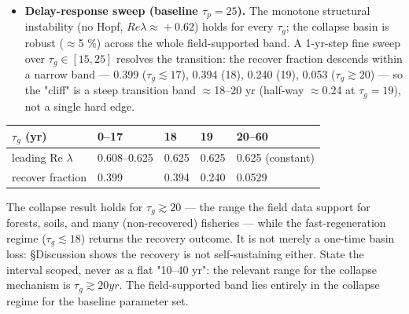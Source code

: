 \documentclass[11pt]{article}
\begin{document}
\begin{itemize}
\item \textbf{Delay-response sweep (baseline $\tau{}_{p}=25$).} The monotone structural instability (no Hopf, $Re \lambda{} \approx{} +0.62$) holds for every $\tau{}_{g}$; the collapse basin is robust (\ensuremath{\approx{}}5 \%) across the whole field-supported band. A 1-yr-step fine sweep over $\tau{}_{g} \in{} [15,25]$ resolves the transition: the recover fraction descends within a narrow band — 0.399 ($\tau{}_{g} \lesssim{} 17$), 0.394 (18), 0.240 (19), 0.053 ($\tau{}_{g} \gtrsim{} 20$) — so the "cliff" is a steep transition band \ensuremath{\approx{}}18–20 yr (half-way \ensuremath{\approx{}}0.24 at $\tau{}_{g} = 19$), not a single hard edge.
\end{itemize}

\begin{table}[htbp]
\centering
\small
\begin{tabularx}{\textwidth}{>{\raggedright\arraybackslash}Xllll}
\toprule
$\tau{}_{g}$ (yr) & 0–17 & 18 & 19 & 20–60 \\
\midrule
leading Re \ensuremath{\lambda{}} & 0.608–0.625 & 0.625 & 0.625 & 0.625 (constant) \\
recover fraction & 0.399 & 0.394 & 0.240 & 0.0529 \\
\bottomrule
\end{tabularx}
\end{table}

The collapse result holds for $\tau{}_{g} \gtrsim{} 20$ — the range the field data support for forests, soils, and many (non-recovered) fisheries — while the fast-regeneration regime ($\tau{}_{g} \lesssim{} 18$) returns the recovery outcome. It is not merely a one-time basin loss: §Discussion shows the recovery is not self-sustaining either. State the interval scoped, never as a flat "10–40 yr": the relevant range for the collapse mechanism is $\tau{}_{g} \gtrsim{} 20 yr$. The field-supported band lies entirely in the collapse regime for the baseline parameter set.
\end{document}
